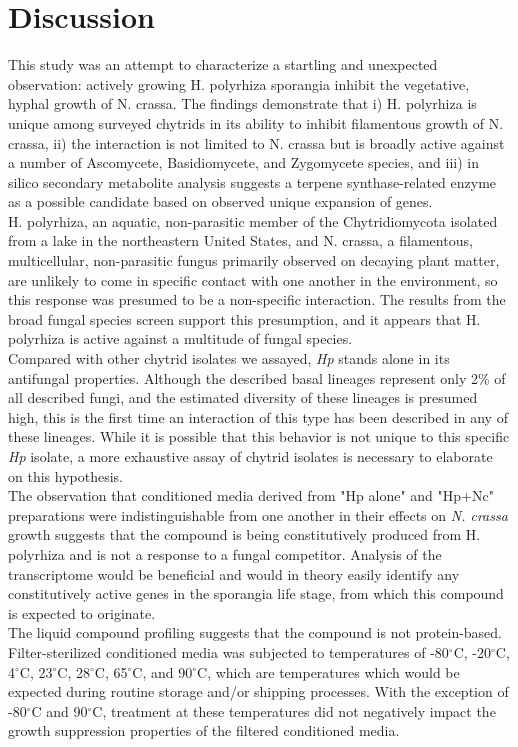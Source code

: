 \section{Discussion}
This study was an attempt to characterize a startling and unexpected observation: actively growing H. polyrhiza sporangia inhibit the vegetative, hyphal growth of N. crassa. The findings demonstrate that i) H. polyrhiza is unique among surveyed chytrids in its ability to inhibit filamentous growth of N. crassa, ii) the interaction is not limited to N. crassa but is broadly active against a number of Ascomycete, Basidiomycete, and Zygomycete species, and iii) in silico secondary metabolite analysis suggests a terpene synthase-related enzyme as a possible candidate based on observed unique expansion of genes.\\
\indent H. polyrhiza, an aquatic, non-parasitic member of the Chytridiomycota isolated from a lake in the northeastern United States, and N. crassa, a filamentous, multicellular, non-parasitic fungus primarily observed on decaying plant matter, are unlikely to come in specific contact with one another in the environment, so this response was presumed to be a non-specific interaction. The results from the broad fungal species screen support this presumption, and it appears that H. polyrhiza is active against a multitude of fungal species.\\
\indent Compared with other chytrid isolates we assayed, \textit{Hp} stands alone in its antifungal properties. Although the described basal lineages represent only 2\% of all described fungi, and the estimated diversity of these lineages is presumed high, this is the first time an interaction of this type has been described in any of these lineages. While it is possible that this behavior is not unique to this specific \textit{Hp} isolate, a more exhaustive assay of chytrid isolates is necessary to elaborate on this hypothesis.\\
\indent The observation that conditioned media derived from "Hp alone" and "Hp+Nc" preparations were indistinguishable from one another in their effects on \textit{N. crassa} growth suggests that the compound is being constitutively produced from H. polyrhiza and is not a response to a fungal competitor. Analysis of the transcriptome would be beneficial and would in theory easily identify any constitutively active genes in the sporangia life stage, from which this compound is expected to originate.\\
\indent The liquid compound profiling suggests that the compound is not protein-based. Filter-sterilized conditioned media was subjected to temperatures of -80$^{\circ}$C, -20$^{\circ}$C, 4$^{\circ}$C, 23$^{\circ}$C, 28$^{\circ}$C, 65$^{\circ}$C, and 90$^{\circ}$C, which are temperatures which would be expected during routine storage and/or shipping processes. With the exception of -80$^{\circ}$C and 90$^{\circ}$C, treatment at these temperatures did not negatively impact the growth suppression properties of the filtered conditioned media.\\
